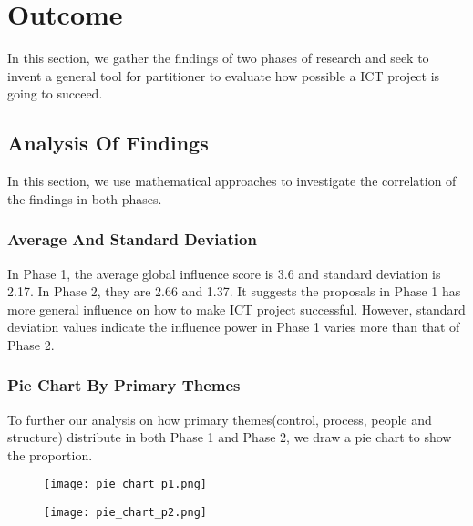 
\section{Outcome}
In this section, we gather the findings of two phases of research and seek to invent a general tool for partitioner to evaluate how possible a ICT project is going to succeed.

\subsection{Analysis Of Findings}

In this section, we use mathematical approaches to investigate the correlation of the findings in both phases.

\subsubsection{Average And Standard Deviation}
In Phase 1, the average global influence score is 3.6 and standard deviation
is 2.17. In Phase 2, they are 2.66 and 1.37. It suggests the proposals in Phase 1 has more general influence on how to make ICT project successful. However, standard deviation values indicate the influence power in Phase 1 varies more than that of Phase 2.
\subsubsection{Pie Chart By Primary Themes}
To further our analysis on how primary themes(control, process, people and structure) distribute in both Phase 1 and Phase 2, we draw a pie chart to show the proportion.

\begin{figure}
\centering
\begin{minipage}{.5\textwidth}
  \centering
  \texttt{[image: pie\_chart\_p1.png]}
  \label{pie:1}
\end{minipage}%
\begin{minipage}{.5\textwidth}
  \centering
  \texttt{[image: pie\_chart\_p2.png]}
  \label{pie:2}
\end{minipage}
\end{figure}


